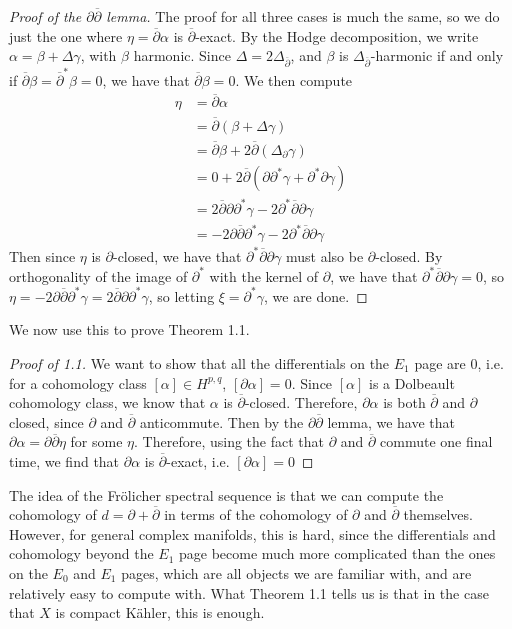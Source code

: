 \documentclass[psamsfonts, 12pt]{amsart}
\theoremstyle{definition}
\theoremstyle{remark}
\newcommand{\dbar}{\overline{\partial}}
\begin{document}
%
\begin{proof}[Proof of the $\partial\dbar$ lemma]
The proof for all three cases is much the same, so we do just the one where
$\eta = \dbar\alpha$ is $\dbar$-exact. By the Hodge decomposition, we write
$\alpha = \beta + \Delta\gamma$, with $\beta$ harmonic. Since
$\Delta = 2\Delta_{\dbar}$, and $\beta$ is $\Delta_{\dbar}$-harmonic if and only
if $\dbar\beta = \dbar^*\beta = 0$, we have that $\dbar\beta = 0$. We then compute
\begin{align*}
\eta &= \dbar\alpha \\
&= \dbar(\beta + \Delta\gamma) \\
&= \dbar\beta + 2\dbar(\Delta_\partial\gamma) \\
&= 0 + 2\dbar(\partial\partial^*\gamma + \partial^*\partial\gamma) \\
&= 2\dbar\partial\partial^*\gamma - 2\partial^*\dbar\partial\gamma \\
&= -2\partial\dbar\partial^*\gamma - 2\partial^*\dbar\partial\gamma
\end{align*}
Then since $\eta$ is $\partial$-closed, we have that $\partial^*\dbar\partial\gamma$
must also be $\partial$-closed. By orthogonality of the image of $\partial^*$ with
the kernel of $\partial$, we have that $\partial^*\dbar\partial\gamma = 0$,
so $\eta = -2\partial\dbar\partial^*\gamma = 2\dbar\partial\partial^*\gamma$,
so letting $\xi = \partial^*\gamma$, we are done.
\end{proof}
%
We now use this to prove Theorem 1.1.
%
\begin{proof}[Proof of 1.1]
We want to show that all the differentials on the $E_1$ page are $0$, i.e.
for a cohomology class $[\alpha] \in H^{p,q}$, $[\partial\alpha] = 0$. Since
$[\alpha]$ is a Dolbeault cohomology class, we know that $\alpha$ is $\dbar$-closed.
Therefore, $\partial\alpha$ is both $\dbar$ and $\partial$ closed, since $\partial$
and $\dbar$ anticommute. Then by the $\partial\dbar$ lemma, we have that
$\partial\alpha = \partial\dbar\eta$ for some $\eta$. Therefore, using the
fact that $\partial$ and $\dbar$ commute one final time, we find that
$\partial\alpha$ is $\dbar$-exact, i.e. $[\partial\alpha] = 0$
\end{proof}
%
The idea of the Fr\"olicher spectral sequence is that we can compute the
cohomology of $d = \partial + \dbar$ in terms of the cohomology of $\partial$
and $\dbar$ themselves. However, for general complex manifolds, this is hard,
since the differentials and cohomology beyond the $E_1$ page become much
more complicated than the ones on the $E_0$ and $E_1$ pages, which are all
objects we are familiar with, and are relatively easy to compute with. What
Theorem 1.1 tells us is that in the case that $X$ is compact K\"ahler, this
is enough.
%
\end{document}
